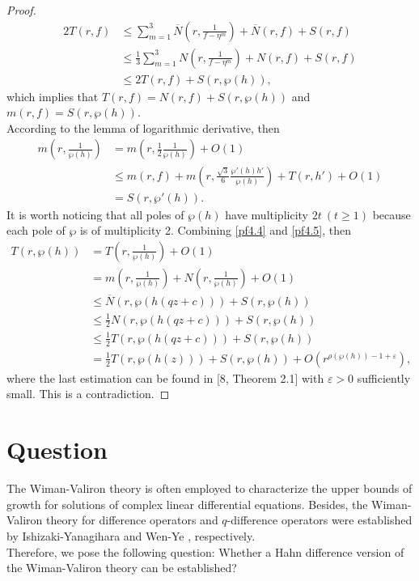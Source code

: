 \documentclass[sn-mathphys-num]{sn-jnl}%
\theoremstyle{thmstyleone}%
\theoremstyle{thmstyletwo}%
\theoremstyle{thmstylethree}%
\begin{document}
\begin{proof}
	\begin{align*}
		2T(r,f)&\leq\sum_{m=1}^{3}\overline{N}\left(r,\frac{1}{f-\eta^{m}}\right)+\overline{N}(r,f)+S(r,f)\\
		&\leq\frac{1}{3}\sum_{m=1}^{3}N\left(r,\frac{1}{f-\eta^{m}}\right)+N(r,f)+S(r,f)\\
		&\leq2T(r,f)+S(r,\wp(h)),
	\end{align*}
	which implies that \(T(r,f)=N(r,f)+S(r,\wp(h))\) and \(m(r,f)=S(r,\wp(h))\).\\
	\indent According to the lemma of logarithmic derivative, then
	\begin{align}\label{pf4.5}
		m\left(r,\frac{1}{\wp(h)}\right)&=m\left(r,\frac{1}{2}\frac{1}{\wp(h)}\right)+O(1)\nonumber\\
		&\leq m(r,f)+m\left(r,\frac{\sqrt{3}}{6}\frac{\wp'(h)h'}{\wp(h)}\right)+T(r,h')+O(1)\\
		&=S(r,\wp'(h)).\nonumber
	\end{align}
	\indent It is worth noticing that all poles of \(\wp(h)\) have multiplicity \(2t~(t\geq1)\) because each pole of \(\wp\) is of multiplicity 2. Combining \eqref{pf4.4} and \eqref{pf4.5}, then
	\begin{align*}
		T(r,\wp(h))&=T\left(r,\frac{1}{\wp(h)}\right)+O(1)\\
		&=m\left(r,\frac{1}{\wp(h)}\right)+N\left(r,\frac{1}{\wp(h)}\right)+O(1)\\
		&\leq\overline{N}(r,\wp(h(qz+c)))+S(r,\wp(h))\\
		&\leq\frac{1}{2}N(r,\wp(h(qz+c)))+S(r,\wp(h))\\
		&\leq\frac{1}{2}T(r,\wp(h(qz+c)))+S(r,\wp(h))\\
		&=\frac{1}{2}T(r,\wp(h(z)))+S(r,\wp(h))+O(r^{\rho(\wp(h))-1+\varepsilon}),
	\end{align*}
	where the last estimation can be found in [8, Theorem 2.1] with \(\varepsilon>0\) sufficiently small. This is a contradiction.
\end{proof}

\section{Question}
\indent The Wiman-Valiron theory is often employed to characterize the upper bounds of growth for solutions of complex linear differential equations. Besides, the Wiman-Valiron theory for difference operators and \(q\)-difference operators were established by Ishizaki-Yanagihara \cite{IY} and Wen-Ye \cite{WY}, respectively.\\
\indent  Therefore, we pose the following question: Whether a Hahn difference version of the Wiman-Valiron theory can be established?
\end{document}
